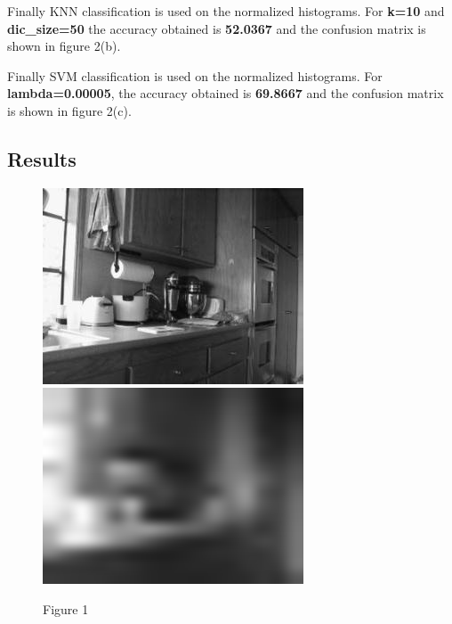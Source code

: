 \documentclass[letter, 11pt]{article}
\begin{document}
Finally KNN classification is used on the normalized histograms. For \textbf{k=10} and \textbf{dic\_size=50} the accuracy obtained is \textbf{52.0367} and the confusion matrix is shown in figure 2(b).

Finally SVM classification is used on the normalized histograms. For \textbf{lambda=0.00005}, the accuracy obtained is \textbf{69.8667} and the confusion matrix is shown in figure 2(c).

\subsection*{Results}
\begin{figure}[H]
        \centering
        \includegraphics[width=\textwidth]{HW3/RESULT/original.png}
    \endminipage\hfill
        \centering
        \includegraphics[width=\textwidth]{HW3/RESULT/tiny.png}
    \endminipage\hfill
    \caption*{Figure 1}
\end{figure}
\end{document}
